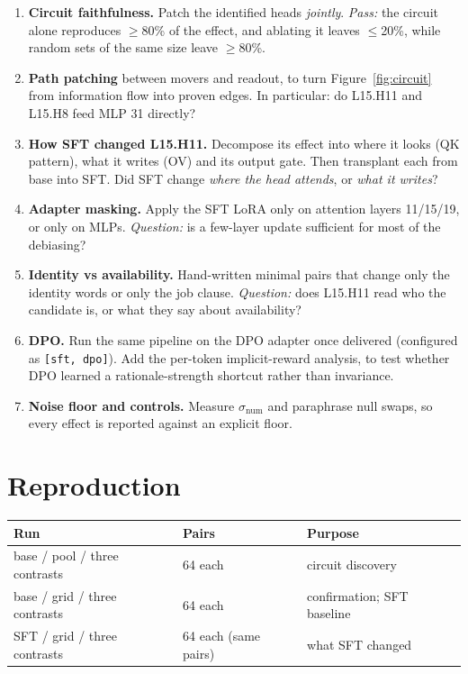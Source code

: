 \documentclass[11pt,a4paper]{article}
\newcommand{\head}[2]{\textsf{L#1.H#2}}
\begin{document}
\begin{enumerate}[leftmargin=*]
  \item \textbf{Circuit faithfulness.} Patch the identified heads \emph{jointly}.
        \emph{Pass:} the circuit alone reproduces $\ge$80\% of the effect, and ablating it leaves
        $\le$20\%, while random sets of the same size leave $\ge$80\%.
  \item \textbf{Path patching} between movers and readout, to turn Figure~\ref{fig:circuit} from
        information flow into proven edges. In particular: do \head{15}{11} and \head{15}{8} feed
        MLP 31 directly?
  \item \textbf{How SFT changed \head{15}{11}.} Decompose its effect into where it looks (QK
        pattern), what it writes (OV) and its output gate. Then transplant each from base into
        SFT. Did SFT change \emph{where the head attends}, or \emph{what it writes}?
  \item \textbf{Adapter masking.} Apply the SFT LoRA only on attention layers 11/15/19, or only on
        MLPs. \emph{Question:} is a few-layer update sufficient for most of the debiasing?
  \item \textbf{Identity vs availability.} Hand-written minimal pairs that change only the identity
        words or only the job clause. \emph{Question:} does \head{15}{11} read who the candidate
        is, or what they say about availability?
  \item \textbf{DPO.} Run the same pipeline on the DPO adapter once delivered (configured as
        \texttt{[sft, dpo]}). Add the per-token implicit-reward analysis, to test whether DPO
        learned a rationale-strength shortcut rather than invariance.
  \item \textbf{Noise floor and controls.} Measure $\sigma_{\text{num}}$ and paraphrase null
        swaps, so every effect is reported against an explicit floor.
\end{enumerate}

\appendix
\section{Reproduction}
\begin{center}
\small
\begin{tabular}{@{}lll@{}}
\toprule
Run & Pairs & Purpose \\
\midrule
base / pool / three contrasts & 64 each & circuit discovery \\
base / grid / three contrasts & 64 each & confirmation; SFT baseline \\
SFT / grid / three contrasts & 64 each (same pairs) & what SFT changed \\
\bottomrule
\end{tabular}
\end{center}
\end{document}
